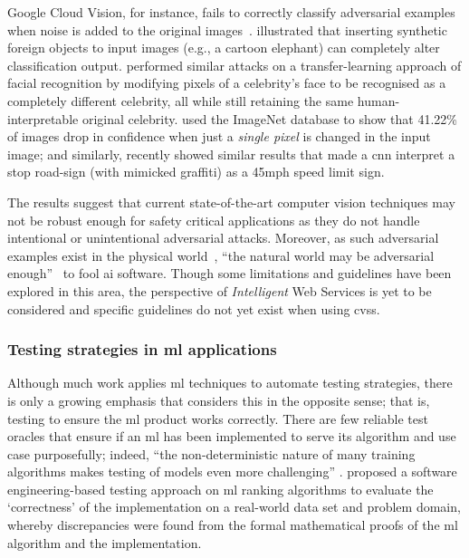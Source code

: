 Google Cloud Vision, for instance, fails to correctly classify adversarial examples when noise is added to the original images~\citep{Hosseini:2018jr}. \citet{Rosenfeld:2018ut} illustrated that inserting synthetic foreign objects to input images (e.g., a cartoon elephant) can completely alter classification output. \citet{Wang:2018vl} performed similar attacks on a transfer-learning approach of facial recognition by modifying pixels of a celebrity's face to be recognised as a completely different celebrity, all while still retaining the same human-interpretable original celebrity. \citet{Su:2017uw} used the ImageNet database to show that 41.22\% of images drop in confidence when just a \textit{single pixel} is changed in the input image; and similarly, \citet{Eykholt:2018vk} recently showed similar results that made a \gls{cnn} interpret a stop road-sign (with mimicked graffiti) as a 45mph speed limit sign.

The results suggest that current state-of-the-art computer vision techniques may not be robust enough for safety critical applications as they do not handle intentional or unintentional adversarial attacks. Moreover, as such adversarial examples exist in the physical world~\citep{Kurakin:2016vw,Eykholt:2018vk}, ``the natural world may be adversarial enough''~\citep{Pezzementi:2018tq} to fool \gls{ai} software. Though some limitations and guidelines have been explored in this area, the perspective of \textit{Intelligent} Web Services is yet to be considered and specific guidelines do not yet exist when using \glspl{cvs}.

\subsubsection{Testing strategies in \gls{ml} applications}

Although much work applies \gls{ml} techniques to automate testing strategies, there is only a growing emphasis that considers this in the opposite sense; that is, testing to ensure the \gls{ml} product works correctly. There are few reliable test oracles that ensure if an \gls{ml} has been implemented to serve its algorithm and use case purposefully; indeed, ``the non-deterministic nature of many training algorithms makes testing of models even more challenging'' \citep{Arpteg2018}.
\citet{murphy2007approach} proposed a software engineering-based testing approach on \gls{ml} ranking algorithms to evaluate the `correctness' of the implementation on a real-world data set and problem domain, whereby discrepancies were found from the formal mathematical proofs of the \gls{ml} algorithm and the implementation. 

